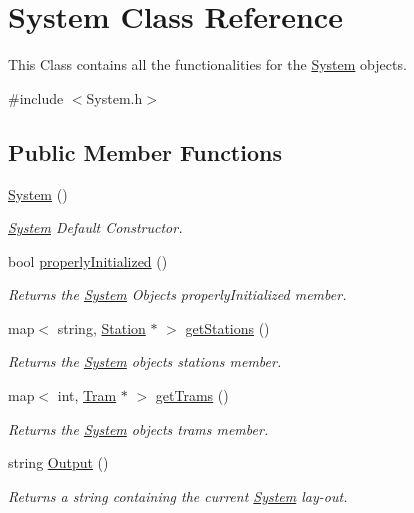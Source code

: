 \hypertarget{classSystem}{}\section{System Class Reference}
\label{classSystem}


This Class contains all the functionalities for the \hyperlink{classSystem}{System} objects.  




{\ttfamily \#include $<$System.\+h$>$}

\subsection*{Public Member Functions}
\begin{DoxyCompactItemize}
\item 
\hyperlink{classSystem_ae317936c9bcf1374d61745572e0f2f8a}{System} ()
\begin{DoxyCompactList}\small\item\em \hyperlink{classSystem}{System} Default Constructor. \end{DoxyCompactList}\item 
bool \hyperlink{classSystem_a8532240d722aafc7084ca6047909c8da}{properly\+Initialized} ()
\begin{DoxyCompactList}\small\item\em Returns the \hyperlink{classSystem}{System} Object\textquotesingle{}s properly\+Initialized member. \end{DoxyCompactList}\item 
map$<$ string, \hyperlink{classStation}{Station} $\ast$ $>$ \hyperlink{classSystem_a30d05f13a13f95f580a0e705142fa3ea}{get\+Stations} ()
\begin{DoxyCompactList}\small\item\em Returns the \hyperlink{classSystem}{System} object\textquotesingle{}s stations member. \end{DoxyCompactList}\item 
map$<$ int, \hyperlink{classTram}{Tram} $\ast$ $>$ \hyperlink{classSystem_a7ef5389572f830ddaa61052ce09f48de}{get\+Trams} ()
\begin{DoxyCompactList}\small\item\em Returns the \hyperlink{classSystem}{System} object\textquotesingle{}s trams member. \end{DoxyCompactList}\item 
string \hyperlink{classSystem_afd117849fbf4d7d8dc0f54988589c249}{Output} ()
\begin{DoxyCompactList}\small\item\em Returns a string containing the current \hyperlink{classSystem}{System} lay-\/out. \end{DoxyCompactList}\item 

\end{DoxyCompactItemize}
